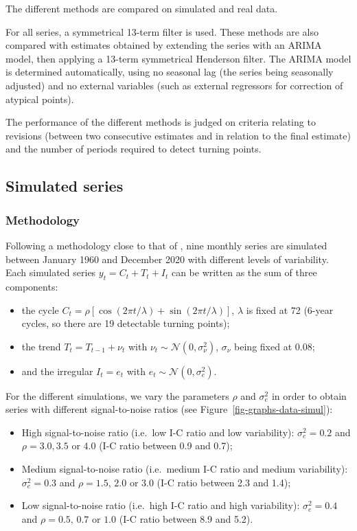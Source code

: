 \documentclass[
]{article}
\newcommand\1{\mathds{1}}
\begin{document}
The different methods are compared on simulated and real data.

For all series, a symmetrical 13-term filter is used. These methods are
also compared with estimates obtained by extending the series with an
ARIMA model, then applying a 13-term symmetrical Henderson filter. The
ARIMA model is determined automatically, using no seasonal lag (the
series being seasonally adjusted) and no external variables (such as
external regressors for correction of atypical points).

The performance of the different methods is judged on criteria relating
to revisions (between two consecutive estimates and in relation to the
final estimate) and the number of periods required to detect turning
points.

\subsection{Simulated series}\label{simulated-series}

\subsubsection{Methodology}\label{methodology}

Following a methodology close to that of \textcite{DarneDagum2009}, nine
monthly series are simulated between January 1960 and December 2020 with
different levels of variability. Each simulated series
\(y_t= C_t+ T_t + I_t\) can be written as the sum of three components:

\begin{itemize}
\item
  the cycle
  \(C_t = \rho [\cos (2 \pi t / \lambda) +\sin (2 \pi t / \lambda)]\),
  \(\lambda\) is fixed at 72 (6-year cycles, so there are 19 detectable
  turning points);
\item
  the trend \(T_t = T_{t-1} + \nu_t\) with
  \(\nu_t \sim \mathcal{N}(0, \sigma_\nu^2)\), \(\sigma_\nu\) being
  fixed at \(0.08\);
\item
  and the irregular \(I_t = e_t\) with
  \(e_t \sim \mathcal{N}(0, \sigma_e^2)\).
\end{itemize}

For the different simulations, we vary the parameters \(\rho\) and
\(\sigma_e^2\) in order to obtain series with different signal-to-noise
ratios (see Figure~\ref{fig-graphs-data-simul}):

\begin{itemize}
\item
  High signal-to-noise ratio (i.e.~low I-C ratio and low variability):
  \(\sigma_e^2=0.2\) and \(\rho = 3.0, 3.5\) or \(4.0\) (I-C ratio
  between 0.9 and 0.7);
\item
  Medium signal-to-noise ratio (i.e.~medium I-C ratio and medium
  variability): \(\sigma_e^2=0.3\) and \(\rho = 1.5,\, 2.0\) or \(3.0\)
  (I-C ratio between 2.3 and 1.4);
\item
  Low signal-to-noise ratio (i.e.~high I-C ratio and high variability):
  \(\sigma_e^2=0.4\) and \(\rho = 0.5,\, 0.7\) or \(1.0\) (I-C ratio
  between 8.9 and 5.2).
\end{itemize}
\end{document}
